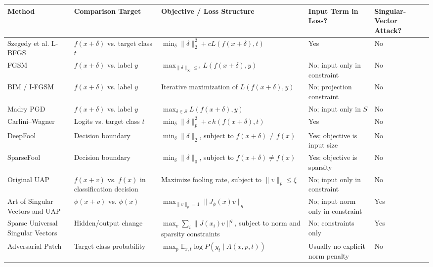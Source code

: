 \documentclass{article}
\begin{document}
\begin{table}[h]
\centering
\small
\begin{tabular}{p{3.2cm} p{3.4cm} p{4.8cm} p{2.2cm} p{2.0cm}}
\hline
\textbf{Method} & \textbf{Comparison Target} & \textbf{Objective / Loss Structure} & \textbf{Input Term in Loss?} & \textbf{Singular-Vector Attack?} \\
\hline
Szegedy et al. L-BFGS
&
\(f(x+\delta)\) vs. target class \(t\)
&
\(\min_\delta \|\delta\|_2^2+cL(f(x+\delta),t)\)
&
Yes
&
No
\\

FGSM
&
\(f(x+\delta)\) vs. label \(y\)
&
\(\max_{\|\delta\|_\infty\le \epsilon} L(f(x+\delta),y)\)
&
No; input only in constraint
&
No
\\

BIM / I-FGSM
&
\(f(x+\delta)\) vs. label \(y\)
&
Iterative maximization of \(L(f(x+\delta),y)\)
&
No; projection constraint
&
No
\\

Madry PGD
&
\(f(x+\delta)\) vs. label \(y\)
&
\(\max_{\delta\in S} L(f(x+\delta),y)\)
&
No; input only in \(S\)
&
No
\\

Carlini--Wagner
&
Logits vs. target class \(t\)
&
\(\min_\delta \|\delta\|_p^2+c\,h(f(x+\delta),t)\)
&
Yes
&
No
\\

DeepFool
&
Decision boundary
&
\(\min_\delta \|\delta\|_2\), subject to \(f(x+\delta)\neq f(x)\)
&
Yes; objective is input size
&
No
\\

SparseFool
&
Decision boundary
&
\(\min_\delta \|\delta\|_0\), subject to \(f(x+\delta)\neq f(x)\)
&
Yes; objective is sparsity
&
No
\\

Original UAP
&
\(f(x+v)\) vs. \(f(x)\) in classification decision
&
Maximize fooling rate, subject to \(\|v\|_p\le \xi\)
&
No; input only in constraint
&
No
\\

Art of Singular Vectors and UAP
&
\(\phi(x+v)\) vs. \(\phi(x)\)
&
\(\max_{\|v\|_p=1}\|J_\phi(x)v\|_q\)
&
No; input norm only in constraint
&
Yes
\\

Sparse Universal Singular Vectors
&
Hidden/output change
&
\(\max_v\sum_i\|J(x_i)v\|^q\), subject to norm and sparsity constraints
&
No; constraints only
&
Yes
\\

Adversarial Patch
&
Target-class probability
&
\(\max_p \mathbb{E}_{x,t}\log P(y_t\mid A(x,p,t))\)
&
Usually no explicit norm penalty
&
No
\\


\end{tabular}
\end{table}
\end{document}
